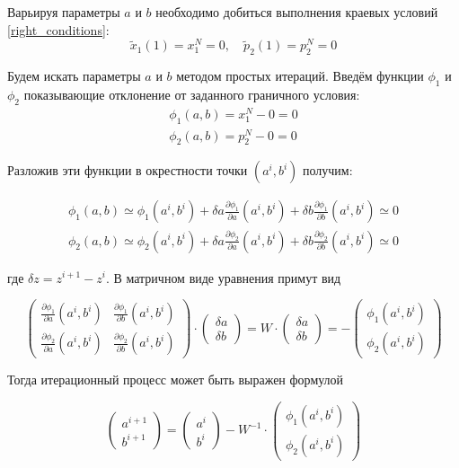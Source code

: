 \documentclass[a4paper,12pt]{article}
\begin{document}
Варьируя параметры \(a\) и \(b\) необходимо добиться выполнения краевых условий \cref{right_conditions}:
\begin{equation*}
  \tilde{x}_1(1)=x_1^N=0, \quad \tilde{p}_2(1)=p_2^N=0
\end{equation*}

Будем искать параметры \(a\) и \(b\) методом простых итераций. Введём
функции \(\phi_1\) и \(\phi_2\) показывающие отклонение от заданного
граничного условия:
\begin{gather*}
  \phi_1(a,b)=x_1^N-0=0\\
  \phi_2(a,b)=p_2^N-0=0
\end{gather*}

Разложив эти функции в окрестности точки \((a^i, b^i)\) получим:

\begin{gather*}
  \phi_1(a,b)\simeq\phi_1(a^i,b^i)+\delta a\frac{\partial \phi_1}{\partial a}(a^i,b^i)+\delta b\frac{\partial \phi_1}{\partial b}(a^i,b^i)\simeq0\\
  \phi_2(a,b)\simeq\phi_2(a^i,b^i)+\delta a\frac{\partial \phi_2}{\partial a}(a^i,b^i)+\delta b\frac{\partial \phi_2}{\partial b}(a^i,b^i)\simeq0
\end{gather*}

где \(\delta z=z^{i+1}-z^{i}\). В матричном виде уравнения примут вид

\begin{equation*}
  \begin{pmatrix} 
    \frac{\partial \phi_1}{\partial a}(a^i,b^i)&\frac{\partial \phi_1}{\partial b}(a^i,b^i)\\
    \frac{\partial \phi_2}{\partial a}(a^i,b^i)&\frac{\partial \phi_2}{\partial b}(a^i,b^i)
  \end{pmatrix} \cdot \begin{pmatrix}
    \delta a\\
    \delta b
  \end{pmatrix} =W\cdot\begin{pmatrix}
    \delta a\\
    \delta b
  \end{pmatrix} = -\begin{pmatrix}
    \phi_1(a^i,b^i)\\
    \phi_2(a^i,b^i)
  \end{pmatrix}
\end{equation*}

Тогда итерационный процесс может быть выражен формулой

\begin{equation*}
  \begin{pmatrix}
    a^{i+1}\\
    b^{i+1}
  \end{pmatrix}=\begin{pmatrix}
    a^{i}\\
    b^{i}
  \end{pmatrix}-W^{-1}\cdot \begin{pmatrix}
    \phi_1(a^i,b^i)\\
    \phi_2(a^i,b^i)
  \end{pmatrix}
\end{equation*}
\end{document}
